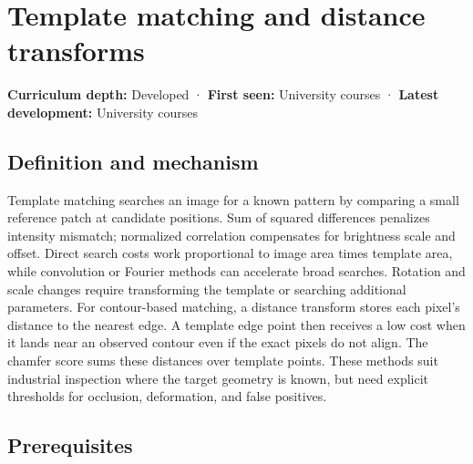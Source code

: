 \hypertarget{appendix-5fb4af80d1c7}{}\label{referencestart:appendix-5fb4af80d1c7}
\section{Template matching and distance transforms}\label{appendix-5fb4af80d1c7-template-matching-and-distance-transforms}

\hypertarget{appendix-5fb4af80d1c7-template-matching-and-distance-transforms}{}

\textbf{Curriculum depth:} Developed · \textbf{First seen:} University courses · \textbf{Latest development:} University courses

\begin{allmightroledefinition}

\subsection{Definition and mechanism}\label{appendix-5fb4af80d1c7-definition-and-mechanism}

\hypertarget{appendix-5fb4af80d1c7-definition-and-mechanism}{}

Template matching searches an image for a known pattern by comparing a small reference patch at candidate positions. Sum of squared differences penalizes intensity mismatch; normalized correlation compensates for brightness scale and offset. Direct search costs work proportional to image area times template area, while convolution or Fourier methods can accelerate broad searches. Rotation and scale changes require transforming the template or searching additional parameters. For contour-based matching, a distance transform stores each pixel's distance to the nearest edge. A template edge point then receives a low cost when it lands near an observed contour even if the exact pixels do not align. The chamfer score sums these distances over template points. These methods suit industrial inspection where the target geometry is known, but need explicit thresholds for occlusion, deformation, and false positives.

\end{allmightroledefinition}

\subsection{Prerequisites}\label{appendix-5fb4af80d1c7-prerequisites}

\hypertarget{appendix-5fb4af80d1c7-prerequisites}{}

